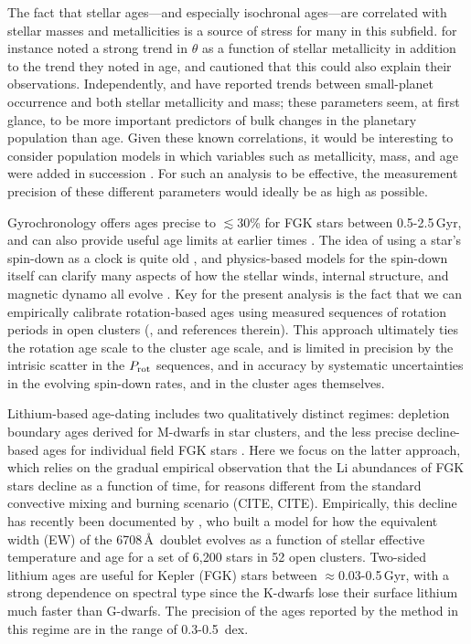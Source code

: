 \documentclass[12pt,twocolumn,tighten]{aastex63}
\begin{document}
The fact that stellar ages---and especially isochronal ages---are
correlated with stellar masses and metallicities is a source of stress
for many in this subfield.  \citet{Sandoval_2021} for instance noted a
strong trend in $\theta$ as a function of stellar metallicity in
addition to the trend they noted in age, and cautioned that this could
also explain their observations.  Independently, \citet{Petigura_2018}
and \citet{Petigura_2022} have reported trends between small-planet
occurrence and both stellar metallicity and mass; these parameters
seem, at first glance, to be more important predictors of bulk changes
in the planetary population than age.  Given these known correlations,
it would be interesting to consider population models in which
variables such as metallicity, mass, and age were added in succession
\citep[e.g.][]{Thorngren_2021}.  For such an analysis to be effective,
the measurement precision of these different parameters would ideally
be as high as possible.

Gyrochronology offers ages precise to $\lesssim$30\% for FGK stars
between 0.5-2.5\,Gyr, and can also provide useful age limits at
earlier times \citep{Bouma_2023}.  The idea of using a star's
spin-down as a clock is quite old
\citep{Skumanich_1972,Noyes_1984,Kawaler_1989,Barnes03,Mamajek_2008,Angus_2015},
and physics-based models for the spin-down itself can clarify many
aspects of how the stellar winds, internal structure, and magnetic
dynamo all evolve
\citep[e.g.][]{Matt_2015,Gallet_Bouvier_2015,Spada_2020}.  Key
for the present analysis is the fact that we can empirically calibrate
rotation-based ages using measured sequences of rotation periods
in open clusters
(\citealt{Bouma_2023}, and references therein).  This approach
ultimately ties the rotation age scale to the cluster age scale, and
is limited in precision by the intrisic scatter in the $P_{\rm rot}$
sequences, and in accuracy by systematic uncertainties in the evolving
spin-down rates, and in the cluster ages themselves.

Lithium-based age-dating includes two qualitatively distinct regimes:
depletion boundary ages derived for M-dwarfs in star clusters, and the
less precise decline-based ages for individual field FGK stars
\citep{Soderblom_2010}.  Here we focus on the latter approach, which
relies on the gradual empirical observation that the Li abundances of
FGK stars decline as a function of time, for reasons different from
the standard convective mixing and burning scenario (CITE, CITE).
Empirically, this decline has recently been documented by
\citet{Jeffries_2023}, who built a model for how the equivalent width
(EW) of the  6708\,\AA\ doublet evolves as a function of
stellar effective temperature and age for a set of 6{,}200 stars in 52
open clusters.  Two-sided lithium ages are useful for Kepler (FGK)
stars between $\approx$0.03-0.5\,Gyr, with a strong dependence on
spectral type since the K-dwarfs lose their surface lithium much
faster than G-dwarfs.  The precision of the ages reported by the
\citet{Jeffries_2023} method in this regime are in the range of
0.3-0.5~dex.
\end{document}
